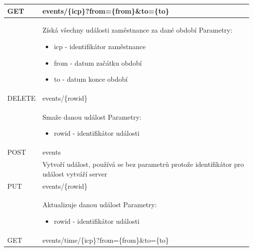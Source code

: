 \documentclass{diplomka}
\begin{document}
\renewcommand{\arraystretch}{1.5}

\begin{center}
\begin{longtable}[H]{| m{2cm} |  m{10cm} |}
\hline
\rowcolor{Gray}
GET & events/\{icp\}?from=\{from\}\&to=\{to\} \\ \hline

&  \parbox{10cm}{\vspace{5 mm}Získá všechny události zaměstnance za dané období\\
Parametry:\begin{itemize}[noitemsep,nolistsep]
\item icp - identifikátor zaměstnance
\item from - datum začátku období
\item to - datum konce období
\end{itemize}
\vspace{5 mm}} \\ \hline
{}
DELETE  & events/\{rowid\} \\  \hline
&  \parbox{10cm}{\vspace{5 mm}Smaže danou událost\\
Parametry:\begin{itemize}[noitemsep,nolistsep]
\item rowid - identifikátor události
\end{itemize}
\vspace{5 mm}} \\ \hline
{}
POST  & events \\  \hline
&  \parbox{10cm}{\vspace{5 mm}Vytvoří událost, používá se bez parametrů protože identifikátor pro událost vytváří server
\vspace{5 mm}} \\ \hline
{}
PUT  & events/\{rowid\} \\  \hline
&  \parbox{10cm}{\vspace{5 mm}Aktualizuje danou událost\\
Parametry:\begin{itemize}[noitemsep,nolistsep]
\item rowid - identifikátor události
\end{itemize}
\vspace{5 mm}} \\ \hline
{}
GET & events/time/\{icp\}?from=\{from\}\&to=\{to\} \\ \hline

\end{longtable}
\end{center}
\end{document}
